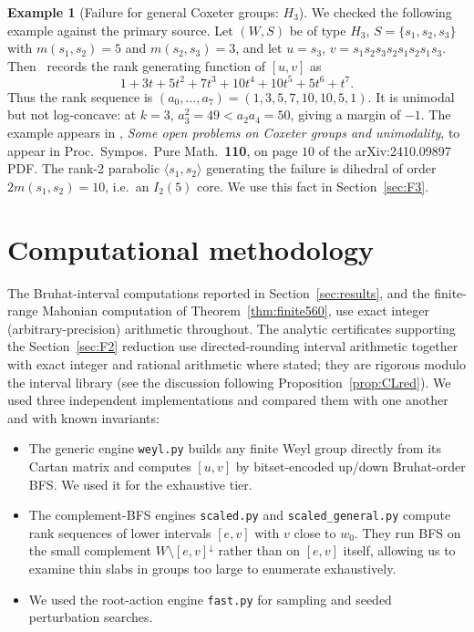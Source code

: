\documentclass[11pt]{amsart}
\theoremstyle{plain}
\theoremstyle{definition}
\newtheorem{example}[theorem]{Example}
\theoremstyle{remark}
\newcommand{\W}{W}
\begin{document}
\begin{example}[Failure for general Coxeter groups: $H_3$]
\label{ex:H3}
We checked the following example against the primary source. Let $(W,S)$ be of type $H_3$, $S=\{s_1,s_2,s_3\}$ with
$m(s_1,s_2)=5$ and $m(s_2,s_3)=3$, and let $u=s_3$,
$v=s_1s_2s_3s_2s_1s_2s_1s_3$. Then~\cite[Conjecture~2.11]{brenti2024open}
records the rank generating function of $[u,v]$ as
\[
1+3t+5t^2+7t^3+10t^4+10t^5+5t^6+t^7.
\]
Thus the rank sequence is
$(a_0,\dots,a_7)=(1,3,5,7,10,10,5,1)$. It is unimodal but not
log-concave: at $k=3$, $a_3^2=49 < a_2a_4=50$, giving a margin of $-1$.
The example appears in \cite[Conjecture~2.11]{brenti2024open},
\emph{Some open problems on Coxeter groups and unimodality}, to appear in
Proc.\ Sympos.\ Pure Math.\ \textbf{110}, on page $10$ of the
arXiv:2410.09897 PDF. The rank-2
parabolic $\langle s_1,s_2\rangle$ generating the failure is dihedral of
order $2m(s_1,s_2)=10$, i.e.\ an $I_2(5)$ core. We use this fact in
Section~\ref{sec:F3}.
\end{example}

\section{Computational methodology}
\label{sec:methods}

The Bruhat-interval computations reported in Section~\ref{sec:results},
and the finite-range Mahonian computation of Theorem~\ref{thm:finite560},
use exact integer (arbitrary-precision) arithmetic throughout. The
analytic certificates supporting the Section~\ref{sec:F2} reduction use
directed-rounding interval arithmetic together with exact integer and
rational arithmetic where stated; they are rigorous modulo the interval
library (see the discussion following Proposition~\ref{prop:CLred}). We
used three independent implementations and compared them with one another
and with known invariants:

\begin{itemize}
\item The generic engine \texttt{weyl.py} builds any finite Weyl group directly from its Cartan matrix and computes $[u,v]$ by
bitset-encoded up/down Bruhat-order BFS. We used it for the exhaustive
tier.
\item The complement-BFS engines \texttt{scaled.py} and
\texttt{scaled\_general.py} compute rank sequences of lower intervals
$[e,v]$ with $v$ close to $w_0$. They run BFS on the small complement
$\W\setminus [e,v]^{\downarrow}$ rather than on $[e,v]$ itself, allowing us to examine thin slabs in groups too large to enumerate exhaustively.
\item We used the root-action engine \texttt{fast.py} for sampling and
seeded perturbation searches.
\end{itemize}
\end{document}

